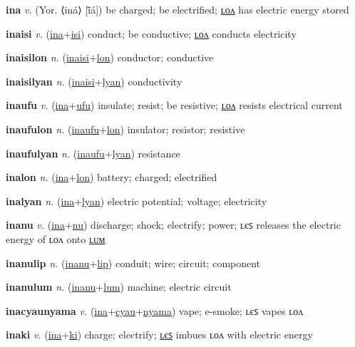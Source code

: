 \textbf{\hypertarget{ina}{ina}} \textit{v.} (Yor. ⟨iná⟩ [ĩ̄á])
be charged; be electrified; \hyperlink{inalon}{ʟᴏᴧ} has electric energy stored

\textbf{\hypertarget{inaisi}{inaisi}} \textit{v.} (\hyperlink{ina}{ina}+\allowbreak \hyperlink{isi}{isi})
conduct; be conductive; \hyperlink{inaisilon}{ʟᴏᴧ} conducts electricity

\textbf{\hypertarget{inaisilon}{inaisilon}} \textit{n.} (\hyperlink{inaisi}{inaisi}+\allowbreak \hyperlink{lon}{lon})
conductor; conductive

\textbf{\hypertarget{inaisilyan}{inaisilyan}} \textit{n.} (\hyperlink{inaisi}{inaisi}+\allowbreak \hyperlink{lyan}{lyan})
conductivity

\textbf{\hypertarget{inaufu}{inaufu}} \textit{v.} (\hyperlink{ina}{ina}+\allowbreak \hyperlink{ufu}{ufu})
insulate; resist; be resistive; \hyperlink{inaufulon}{ʟᴏᴧ} resists electrical current

\textbf{\hypertarget{inaufulon}{inaufulon}} \textit{n.} (\hyperlink{inaufu}{inaufu}+\allowbreak \hyperlink{lon}{lon})
insulator; resistor; resistive

\textbf{\hypertarget{inaufulyan}{inaufulyan}} \textit{n.} (\hyperlink{inaufu}{inaufu}+\allowbreak \hyperlink{lyan}{lyan})
resistance

\textbf{\hypertarget{inalon}{inalon}} \textit{n.} (\hyperlink{ina}{ina}+\allowbreak \hyperlink{lon}{lon})
battery; charged; electrified

\textbf{\hypertarget{inalyan}{inalyan}} \textit{n.} (\hyperlink{ina}{ina}+\allowbreak \hyperlink{lyan}{lyan})
electric potential; voltage; electricity

\textbf{\hypertarget{inanu}{inanu}} \textit{v.} (\hyperlink{ina}{ina}+\allowbreak \hyperlink{nu}{nu})
discharge; shock; electrify; power; ʟєꜱ releases the electric energy of ʟᴏᴧ onto \hyperlink{inanulum}{ʟᴜᴍ}

\textbf{\hypertarget{inanulip}{inanulip}} \textit{n.} (\hyperlink{inanu}{inanu}+\allowbreak \hyperlink{lip}{lip})
conduit; wire; circuit; component

\textbf{\hypertarget{inanulum}{inanulum}} \textit{n.} (\hyperlink{inanu}{inanu}+\allowbreak \hyperlink{lum}{lum})
machine; electric circuit

\textbf{\hypertarget{inacyaunyama}{inacyaunyama}} \textit{v.} (\hyperlink{ina}{ina}+\allowbreak \hyperlink{cyau}{cyau}+\allowbreak \hyperlink{nyama}{nyama})
vape; e-smoke; ʟєꜱ vapes ʟᴏᴧ

\textbf{\hypertarget{inaki}{inaki}} \textit{v.} (\hyperlink{ina}{ina}+\allowbreak \hyperlink{ki}{ki})
charge; electrify; \hyperlink{inakiles}{ʟєꜱ} imbues ʟᴏᴧ with electric energy

